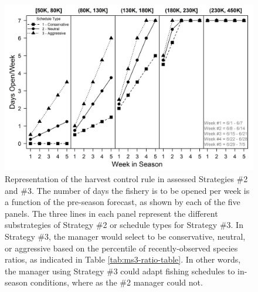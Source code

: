 \documentclass[12pt,]{book}
\theoremstyle{definition}
\theoremstyle{definition}
\theoremstyle{definition}
\theoremstyle{remark}
\begin{document}
\begin{singlespace}
\begin{figure}
  \centering
  \includegraphics{img/Ch3/Schedules.png}
  \caption{Representation of the harvest control rule in assessed Strategies \#2 and \#3. The number of days the fishery is to be opened per week is a function of the pre-season forecast, as shown by each of the five panels. The three lines in each panel represent the different substrategies of Strategy \#2 or schedule types for Strategy \#3. In Strategy \#3, the manager would select to be conservative, neutral, or aggressive based on the percentile of recently-observed species ratios, as indicated in Table \ref{tab:ms3-ratio-table}. In other words, the manager using Strategy \#3 could adapt fishing schedules to in-season conditions, where as the \#2 manager could not.}
  \label{fig:ms2-schedules}
\end{figure}

\clearpage


\end{singlespace}
\end{document}
